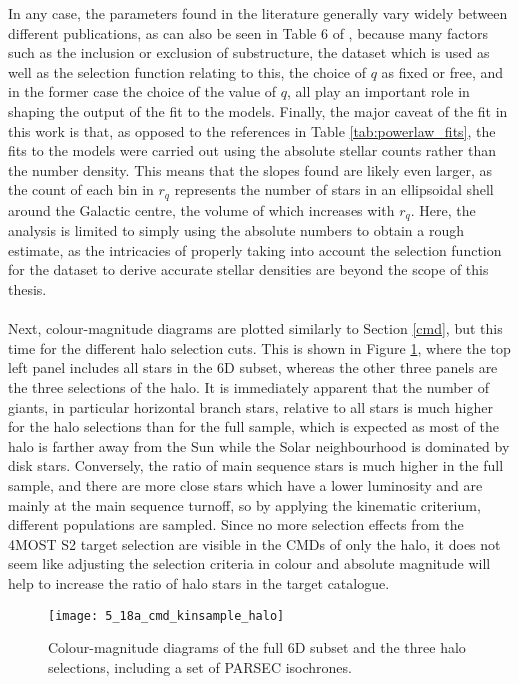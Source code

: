 \documentclass[a4paper,11pt]{article}
\begin{document}
In any case, the parameters found in the literature generally vary widely between different publications, as can also be seen in Table 6 of \citet{bland16}, because many factors such as the inclusion or exclusion of substructure, the dataset which is used as well as the selection function relating to this, the choice of $q$ as fixed or free, and in the former case the choice of the value of $q$, all play an important role in shaping the output of the fit to the models. Finally, the major caveat of the fit in this work is that, as opposed to the references in Table \ref{tab:powerlaw_fits}, the fits to the models were carried out using the absolute stellar counts rather than the number density. This means that the slopes found are likely even larger, as the count of each bin in $r_q$ represents the number of stars in an ellipsoidal shell around the Galactic centre, the volume of which increases with $r_q$. Here, the analysis is limited to simply using the absolute numbers to obtain a rough estimate, as the intricacies of properly taking into account the selection function for the dataset to derive accurate stellar densities are beyond the scope of this thesis.\\ \\
%
Next, colour-magnitude diagrams are plotted similarly to Section \ref{cmd}, but this time for the different halo selection cuts. This is shown in Figure \ref{fig:cmds_kin_halo}, where the top left panel includes all stars in the 6D subset, whereas the other three panels are the three selections of the halo. It is immediately apparent that the number of giants, in particular horizontal branch stars, relative to all stars is much higher for the halo selections than for the full sample, which is expected as most of the halo is farther away from the Sun while the Solar neighbourhood is dominated by disk stars. Conversely, the ratio of main sequence stars is much higher in the full sample, and there are more close stars which have a lower luminosity and are mainly at the main sequence turnoff, so by applying the kinematic criterium, different populations are sampled. Since no more selection effects from the 4MOST S2 target selection are visible in the CMDs of only the halo, it does not seem like adjusting the selection criteria in colour and absolute magnitude will help to increase the ratio of halo stars in the target catalogue.
%
\begin{figure}[ht]
 \centering
 \texttt{[image: 5\_18a\_cmd\_kinsample\_halo]}
 \caption[CMDs of 6D subset and halo selections]{Colour-magnitude diagrams of the full 6D subset and the three halo selections, including a set of PARSEC isochrones.}
 \label{fig:cmds_kin_halo}
\end{figure}\\
\end{document}

